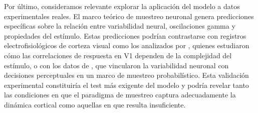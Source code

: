 Por último, consideramos relevante explorar la aplicación del modelo a datos experimentales reales. El marco teórico de muestreo neuronal genera predicciones específicas sobre la relación entre variabilidad neural, oscilaciones gamma y propiedades del estímulo. Estas predicciones podrían contrastarse con registros electrofisiológicos de corteza visual como los analizados por \citet{banyai2019stimulus}, quienes estudiaron cómo las correlaciones de respuesta en \acrshort{V1} dependen de la complejidad del estímulo, o con los datos de \citet{haefner2016perceptual}, que vincularon la variabilidad neuronal con decisiones perceptuales en un marco de muestreo probabilístico. Esta validación experimental constituiría el test más exigente del modelo y podría revelar tanto las condiciones en que el paradigma de muestreo captura adecuadamente la dinámica cortical como aquellas en que resulta insuficiente.










